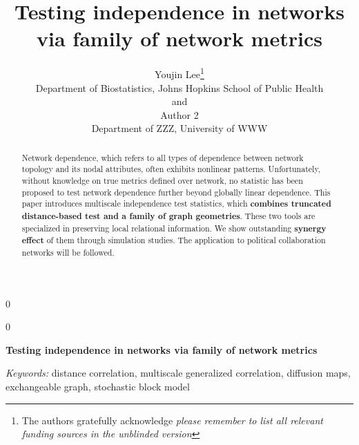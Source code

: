 \documentclass[12pt]{article}
\newcommand{\blind}{0}
\theoremstyle{definition}
\begin{document}
	
	
	\def\spacingset#1{\renewcommand{\baselinestretch}%
		{#1}\small\normalsize} \spacingset{1}
	
	
	
	\blind
	{
		\title{\bf Testing independence in networks via family of network metrics}
		\author{Youjin Lee\thanks{
				The authors gratefully acknowledge \textit{please remember to list all relevant funding sources in the unblinded version}}\hspace{.2cm}\\
			Department of Biostatistics, Johns Hopkins School of Public Health\\
			and \\
			Author 2 \\
			Department of ZZZ, University of WWW}
		\maketitle
	} \fi
	
	\blind
	{
		\bigskip
		\bigskip
		\bigskip
		\begin{center}
			{\LARGE\bf Testing independence in networks via family of network metrics}
		\end{center}
		\medskip
	} \fi
	
	
\sloppy
\bigskip
\begin{abstract}
		Network dependence, which refers to all types of dependence between network topology and its nodal attributes, often exhibits nonlinear patterns. Unfortunately, without knowledge on true metrics defined over network, no statistic has been proposed to test network dependence further beyond globally linear dependence. This paper introduces multiscale independence test statistics, which \textbf{combines truncated distance-based test and a family of graph geometries}. These two tools are specialized in preserving local relational information. We show outstanding \textbf{synergy effect} of them through simulation studies. The application to political collaboration networks will be followed. 
\end{abstract}
	
	\noindent%
	{\it Keywords:} distance correlation, multiscale generalized correlation, diffusion maps, exchangeable graph, stochastic block model 
	\vfill
	
	\newpage
	\spacingset{1.45} %
\end{document}

